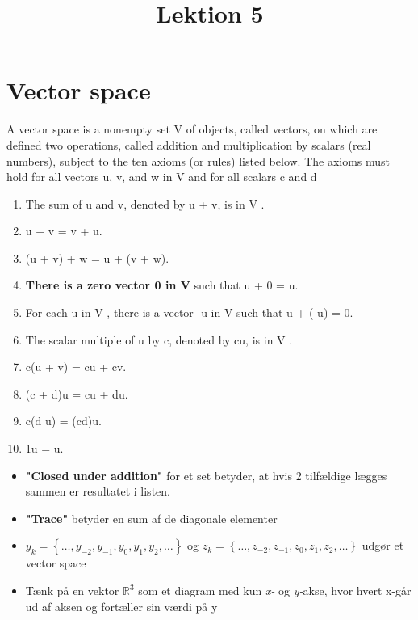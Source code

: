 \documentclass[danish, english]{article}
\title{Lektion 5}
\begin{document}
\maketitle


\section*{Vector space}

\begin{theo}[De ti Axioms]
A vector space is a nonempty set V of objects, called vectors, on which are defined two operations, called addition and multiplication by scalars (real numbers), subject to the ten axioms (or rules) listed below.
The axioms must hold for all vectors u, v, and w in V and for all scalars c and d

\begin{enumerate}
\item The sum of u and v, denoted by u + v, is in V .
\item u + v = v + u.
\item (u + v) + w = u + (v + w).
\item \textbf{There is a zero vector 0 in V} such that u + 0 = u.
\item For each u in V , there is a vector -u in V such that u + (-u) = 0.
\item The scalar multiple of u by c, denoted by cu, is in V .
\item c(u + v) = cu + cv.
\item (c + d)u = cu + du.
\item c(d u) = (cd)u.
\item 1u = u.

\end{enumerate}
\end{theo}

\begin{itemize}
\item \textbf{"Closed under addition"} for et set betyder, at hvis 2 tilfældige lægges sammen er resultatet i listen.

\item \textbf{"Trace"} betyder en sum af de diagonale elementer

\item $y_k = \left\{ \dots, y_{-2}, y_{-1}, y_0, y_1, y_2, \dots\right\}$ og $z_k = \left\{ \dots, z_{-2}, z_{-1}, z_0, z_1, z_2, \dots\right\}$ udgør et vector space

\item Tænk på en vektor $\mathbb{R}^3$ som et diagram med kun \textit{x-} og \textit{y-}akse, hvor hvert x-går ud af aksen og fortæller sin værdi på y
\end{itemize}
\end{document}
